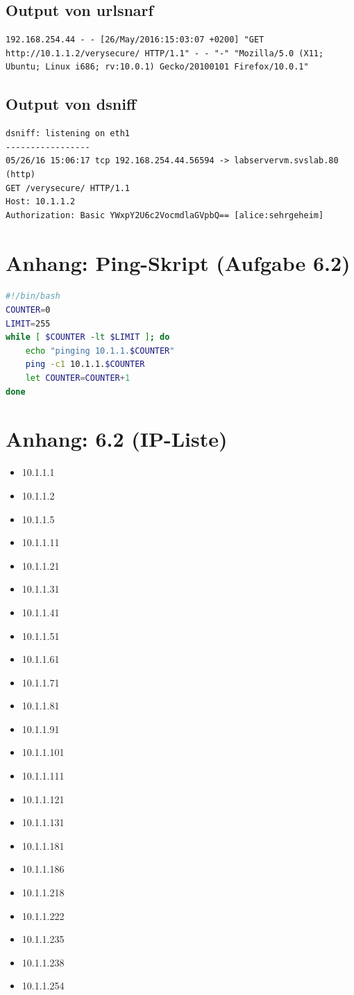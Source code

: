 \documentclass[twoside]{article}
\begin{document}
\subsection*{Output von urlsnarf}
\label{urlsnarf}
\begin{lstlisting}
192.168.254.44 - - [26/May/2016:15:03:07 +0200] "GET http://10.1.1.2/verysecure/ HTTP/1.1" - - "-" "Mozilla/5.0 (X11; Ubuntu; Linux i686; rv:10.0.1) Gecko/20100101 Firefox/10.0.1"
\end{lstlisting}
\subsection*{Output von dsniff}
\label{dsniff}
\begin{lstlisting}
dsniff: listening on eth1
-----------------
05/26/16 15:06:17 tcp 192.168.254.44.56594 -> labservervm.svslab.80 (http)
GET /verysecure/ HTTP/1.1
Host: 10.1.1.2
Authorization: Basic YWxpY2U6c2VocmdlaGVpbQ== [alice:sehrgeheim] 
\end{lstlisting}
\section*{Anhang: Ping-Skript (Aufgabe 6.2)}
\label{script}
\begin{lstlisting}[language=Bash]
#!/bin/bash
COUNTER=0
LIMIT=255
while [ $COUNTER -lt $LIMIT ]; do
	echo "pinging 10.1.1.$COUNTER"
	ping -c1 10.1.1.$COUNTER
	let COUNTER=COUNTER+1
done
\end{lstlisting}

\section*{Anhang: 6.2 (IP-Liste)}
\label{iplist}
\begin{itemize}
		\item 10.1.1.1
		\item 10.1.1.2
		\item 10.1.1.5
		\item 10.1.1.11
		\item 10.1.1.21
		\item 10.1.1.31
		\item 10.1.1.41
		\item 10.1.1.51
		\item 10.1.1.61
		\item 10.1.1.71
		\item 10.1.1.81
		\item 10.1.1.91
		\item 10.1.1.101
		\item 10.1.1.111
		\item 10.1.1.121
		\item 10.1.1.131
		\item 10.1.1.181
		\item 10.1.1.186
		\item 10.1.1.218
		\item 10.1.1.222
		\item 10.1.1.235
		\item 10.1.1.238
		\item 10.1.1.254
	\end{itemize}
\end{document}
